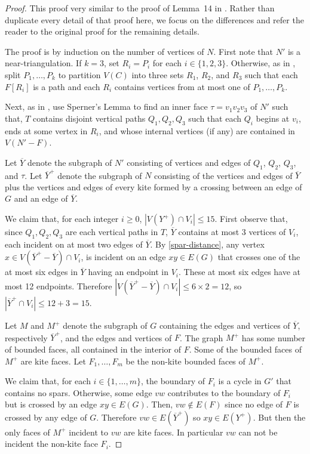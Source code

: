 \documentclass{patmorin}
\begin{document}
\begin{proof}
  This proof very similar to the proof of Lemma~14 in \citet{dujmovic.joret.ea:planar}. Rather than duplicate every detail of that proof here, we focus on the differences and refer the reader to the original proof for the remaining details.
  
  The proof is by induction on the number of vertices of $N$.
  First note that $N'$ is a near-triangulation.  If $k=3$, set $R_i=P_i$ for each $i\in\{1,2,3\}$.  Otherwise, as in \citet{dujmovic.joret.ea:planar}, split $P_1,\ldots,P_k$ to partition $V(C)$ into three sets $R_1$, $R_2$, and $R_3$ such that each $F[R_i]$ is a path and each $R_i$ contains vertices from at most one of $P_1,\ldots,P_k$. 
  
  Next, as in \citet{dujmovic.joret.ea:planar}, use Sperner's Lemma to find an inner face $\tau=v_1v_2v_3$ of $N'$ such that, $T$ contains disjoint vertical paths $Q_1,Q_2,Q_3$ such that each $Q_i$ begins at $v_i$, ends at some vertex in $R_i$, and whose internal vertices (if any) are contained in $V(N'-F)$.
  
  Let $\overline{Y}$ denote the subgraph of $N'$ consisting of vertices and edges of $Q_1$, $Q_2$, $Q_3$, and $\tau$.  Let $\overline{Y}^+$ denote the subgraph of $N$ consisting of the vertices and edges of $\overline{Y}$ plus the vertices and edges of every kite formed by a crossing between an edge of $G$ and an edge of $\overline{Y}$.
  
  We claim that, for each integer $i\ge 0$, $|V(Y^+)\cap V_i|\le 15$.  First observe that, since $Q_1,Q_2,Q_3$ are each vertical paths in $T$,  $\overline{Y}$ contains at most 3 vertices of $V_i$, each incident on at most two edges of $\overline{Y}$.  By \eqref{spar-distance}, any vertex $x\in V(\overline{Y}^+-\overline{Y})\cap V_i$, is incident on an edge $xy\in E(G)$ that crosses one of the at most six edges in $\overline{Y}$ having an endpoint in $V_i$.  These at most six edges have at most 12 endpoints.  Therefore $|V(\overline{Y}^+-\overline{Y})\cap V_i|\le 6\times 2=12$, so $|\overline{Y}^+\cap V_i|\le 12+3=15$.
  
  Let $M$ and $M^+$ denote the subgraph of $G$ containing the edges and vertices of $\overline{Y}$, respectively $\overline{Y}^+$, and the edges and vertices of $F$.  The graph $M^+$ has some number of bounded faces, all contained in the interior of $F$. Some of the bounded faces of $M^+$ are kite faces. Let $F_1,\ldots,F_m$ be the non-kite bounded faces of $M^+$.  
  
  We claim that, for each $i\in\{1,\ldots,m\}$, the boundary of $F_i$ is a cycle in $G'$ that contains no spars. Otherwise, some edge $vw$ contributes to the boundary of $F_i$ but is crossed by an edge $xy\in E(G)$. Then, $vw\not\in E(F)$ since no edge of $F$ is crossed by any edge of $G$. Therefore $vw\in E(\overline{Y}^+)$ so $xy\in E(Y^+)$. But then the only faces of $M^+$ incident to $vw$ are kite faces.  In particular $vw$ can not be incident the non-kite face $F_i$.
  

\end{proof}
\end{document}
